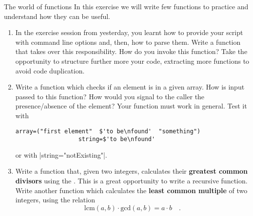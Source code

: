 
\begin{exercise}[Instructive]{The world of functions}
    In this exercise we will write few functions to practice and understand how they can be useful.
    \begin{enumerate}
        \item In the exercise session from yesterday, you learnt how to provide your script with command line options and, then, how to parse them.
              Write a function that takes over this responsibility.
              How do you invoke this function?
              Take the opportunity to structure further more your code, extracting more functions to avoid code duplication.
        \item Write a function which checks if an element is in a given array.
              How is input passed to this function?
              How would you signal to the caller the presence/absence of the element?
              Your function must work in general.
              Test it with
              \begin{lstlisting}[style=MyBash]
                  array=("first element"  $'to be\nfound'  "something")
                  string=$'to be\nfound'
              \end{lstlisting}
              or with \bash|string="notExisting"|.
        \item Write a function that, given two integers, calculates their \textbf{greatest common divisors} using the .
              This is a great opportunity to write a recursive function.
              Write another function which calculates the \textbf{least common multiple} of two integers, using the relation
              \[
                \mbox{lcm}(a,b)\cdot\mbox{gcd}(a,b)=a\cdot b \quad.
              \]
    \end{enumerate}
\end{exercise}


